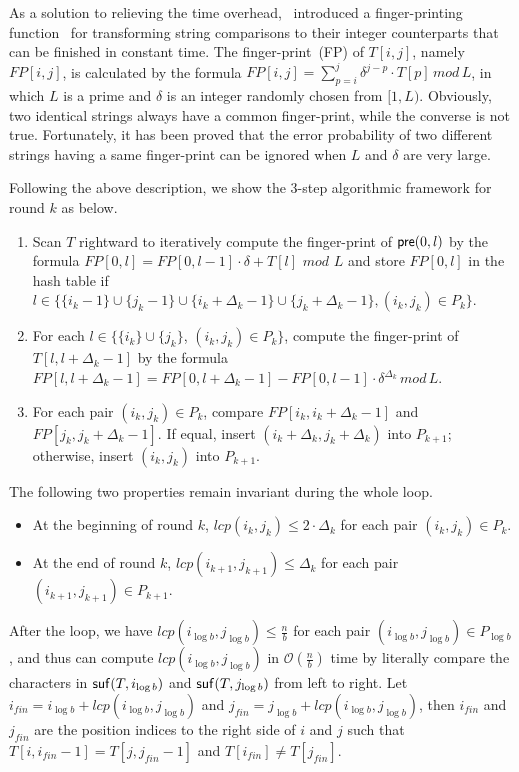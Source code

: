 \documentclass{llncs}
\begin{document}
As a solution to relieving the time overhead,~\cite{Philip2013} introduced a finger-printing function~\cite{Karp1987} for transforming string comparisons to their integer counterparts that can be finished in constant time. The finger-print~(FP) of $T[i,j]$, namely $FP[i,j]$, is calculated by the formula $FP[i,j] = \sum_{p=i}^{j} \delta^{j-p} \cdot T[p] \, mod \, L$, in which $L$ is a prime and $\delta$ is an integer randomly chosen from $[1,L)$. Obviously, two identical strings always have a common finger-print, while the converse is not true. Fortunately, it has been proved that the error probability of two different strings having a same finger-print can be ignored when $L$ and $\delta$ are very large.

Following the above description, we show the 3-step algorithmic framework for round $k$ as below.

\begin{enumerate}[S1.]
\item Scan $T$ rightward to iteratively compute the finger-print of ${\sf pre}(0,l)$ by the formula $FP[0,l] = FP[0,l-1] \cdot \delta + T[l] \,\, mod \,\, L$ and store $FP[0,l]$ in the hash table if $l\in \{ \{i_k-1\}\cup\{j_k-1\}\cup\{i_k +\Delta_{k} - 1\}\cup\{j_k+ \Delta_{k} - 1\},(i_k,j_k)\in P_k\}$.
\item For each $l\in \{\{i_k\}\cup \{j_k\}$, $(i_k,j_k)\in P_k\}$, compute the finger-print of $T[l,l+\Delta_{k} - 1]$ by the formula $FP[l,l+ \Delta_{k} - 1]=FP[0,l+ \Delta_{k} - 1] - FP[0,l-1] \cdot \delta^{\Delta_{k}} \, mod \, L$.
\item For each pair $(i_k,j_k)\in P_k$, compare $FP[i_k,i_k+\Delta_{k} - 1]$ and $FP[j_k,j_k+\Delta_{k} - 1]$. If equal, insert $(i_k+\Delta_{k},j_k+\Delta_{k})$ into $P_{k+1}$; otherwise, insert $(i_k, j_k)$ into $P_{k+1}$.
\end{enumerate}

The following two properties remain invariant during the whole loop.

\begin{itemize}
\item At the beginning of round $k$, $lcp(i_k,j_k) \le 2 \cdot \Delta_{k}$ for each pair $(i_k,j_k) \in P_k$.
\item At the end of round $k$, $lcp(i_{k+1},j_{k+1}) \le \Delta_{k}$ for each pair $(i_{k+1},j_{k+1}) \in P_{k+1}$.
\end{itemize}

After the loop, we have $lcp(i_{\log b},j_{\log b}) \le \frac{n}{b}$ for each pair $(i_{\log b},j_{\log b}) \in P_{\log b}$, and thus can compute $lcp(i_{\log b}, j_{\log b})$ in $\mathcal{O}(\frac{n}{b})$ time by literally compare the characters in ${\sf suf}(T,i_{\log b})$ and ${\sf suf}(T,j_{\log b})$ from left to right. Let $i_{fin} = i_{\log b} + lcp(i_{\log b}, j_{\log b})$ and $j_{fin}= j_{\log b} + lcp(i_{\log b}, j_{\log b})$, then $i_{fin}$ and $j_{fin}$ are the position indices to the right side of $i$ and $j$ such that $T[i,i_{fin}-1] = T[j,j_{fin}-1]$ and $T[i_{fin}] \neq T[j_{fin}]$.
\end{document}
